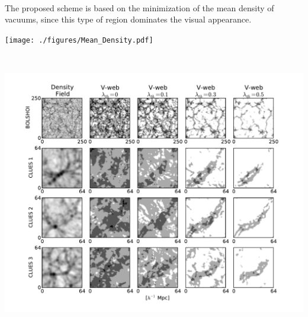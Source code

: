 \documentclass[8pt,fleqn]{beamer}
\begin{document}
\begin{frame}
\begin{tcolorbox}[colback=white!5,colframe=black!75!black,title=Classification of the Cosmic Web]\justifying
\

	The proposed scheme is based on the minimization of the mean density of
	vacuums, since this type of region dominates the visual appearance.

	\begin{center}
	\texttt{[image: ./figures/Mean\_Density.pdf]}
	\end{center}

\

\end{tcolorbox}
\end{frame}
\begin{frame}
\begin{tcolorbox}[colback=white!5,colframe=black!75!black,title=Classification of the Cosmic Web]\justifying

	\begin{center}
	\includegraphics[trim = 5mm 5mm 5mm 5mm, clip, width=.9\textwidth]
	{./figures/Vweb_Comparison.pdf}
	\end{center}

\end{tcolorbox}
\end{frame}
\end{document}
